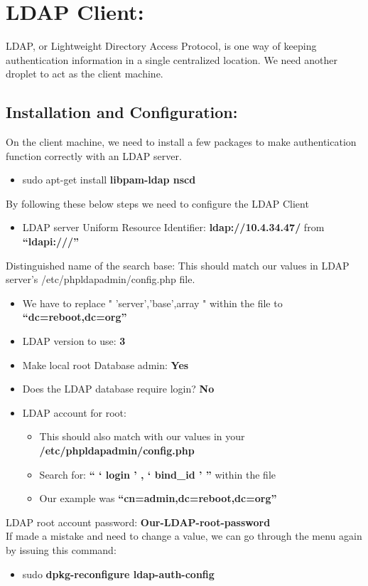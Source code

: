 \documentclass[12pt]{report}
\begin{document}
\section{LDAP Client:}		
	LDAP, or Lightweight Directory Access Protocol, is one way of keeping authentication information in a single centralized location. We need another droplet to act as the client machine.
	\subsection{Installation and Configuration:}
		On the client machine, we need to install a few packages to make authentication function correctly with an LDAP server.	
		\begin{itemize}
		\item sudo apt-get install \textbf{libpam-ldap nscd}
		\end{itemize}		 
By following these below steps we need to configure the LDAP Client
		\begin{itemize}
		\item LDAP server Uniform Resource Identifier: \textbf{ldap://10.4.34.47/} from \textbf{``ldapi:///''}		
		\end{itemize}

		Distinguished name of the search base:
		This should match our values in LDAP server's /etc/phpldapadmin/config.php file.
		\begin{itemize}
		\item We have to replace " 'server','base',array " within the file to \textbf{``dc=reboot,dc=org''}
		\item LDAP version to use:\textbf{ 3}
		\item Make local root Database admin: \textbf{Yes}
		\item Does the LDAP database require login? \textbf{No}
	 	\item LDAP account for root:
		 	\begin{itemize}
	 		\item This should also match with our values in your \textbf{/etc/phpldapadmin/config.php}
			\item Search for: \textbf{`` ` login ' , ` bind\_id ' '' } within the file
			\item Our example was \textbf{``cn=admin,dc=reboot,dc=org''}
		 	\end{itemize}
		\end{itemize}
		LDAP root account password: \textbf{Our-LDAP-root-password}
		\\
		\linebreak
		If made a mistake and need to change a value, we can go through the menu again by issuing this command:
		\begin{itemize}
		\item sudo \textbf{dpkg-reconfigure ldap-auth-config}
		\end{itemize}
		
\end{document}
